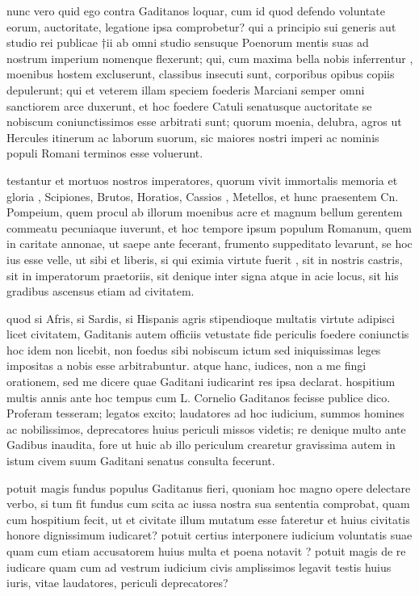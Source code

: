  nunc vero quid ego contra Gaditanos loquar, cum id quod defendo voluntate eorum, auctoritate, legatione ipsa comprobetur? qui a principio sui generis aut studio rei publicae †ii ab omni studio sensuque Poenorum mentis suas ad nostrum imperium nomenque flexerunt; qui, cum maxima bella nobis inferrentur , moenibus hostem excluserunt, classibus insecuti sunt, corporibus opibus copiis depulerunt; qui et veterem illam speciem foederis Marciani semper omni sanctiorem arce duxerunt, et hoc foedere Catuli senatusque auctoritate se nobiscum coniunctissimos esse arbitrati sunt; quorum moenia, delubra, agros ut Hercules itinerum ac laborum suorum, sic maiores nostri imperi ac nominis populi Romani terminos esse voluerunt.

 testantur et mortuos nostros imperatores, quorum vivit immortalis memoria et gloria , Scipiones, Brutos, Horatios, Cassios , Metellos, et hunc praesentem Cn. Pompeium, quem procul ab illorum moenibus acre et magnum bellum gerentem commeatu pecuniaque iuverunt, et hoc tempore ipsum populum Romanum, quem in caritate annonae, ut saepe ante fecerant, frumento suppeditato levarunt, se hoc ius esse velle, ut sibi et liberis, si qui eximia virtute fuerit , sit in nostris castris, sit in imperatorum praetoriis, sit denique inter signa atque in acie locus, sit his gradibus ascensus etiam ad civitatem.

 quod si Afris, si Sardis, si Hispanis agris stipendioque multatis virtute adipisci licet civitatem, Gaditanis autem officiis vetustate fide periculis foedere coniunctis hoc idem non licebit, non foedus sibi nobiscum ictum sed iniquissimas leges impositas a nobis esse arbitrabuntur. atque hanc, iudices, non a me fingi orationem, sed me dicere quae Gaditani iudicarint res ipsa declarat. hospitium multis annis ante hoc tempus cum L. Cornelio Gaditanos fecisse publice dico. Proferam tesseram; legatos excito; laudatores ad hoc iudicium, summos homines ac nobilissimos, deprecatores huius periculi missos videtis; re denique multo ante Gadibus inaudita, fore ut huic ab illo periculum crearetur gravissima autem in istum civem suum Gaditani senatus consulta fecerunt.

 potuit magis fundus populus Gaditanus fieri, quoniam hoc magno opere delectare verbo, si tum fit fundus cum scita ac iussa nostra sua sententia comprobat, quam cum hospitium fecit, ut et civitate illum mutatum esse fateretur et huius civitatis honore dignissimum iudicaret? potuit certius interponere iudicium voluntatis suae quam cum etiam accusatorem huius multa et poena notavit ? potuit magis de re iudicare quam cum ad vestrum iudicium civis amplissimos legavit testis huius iuris, vitae laudatores, periculi deprecatores?

